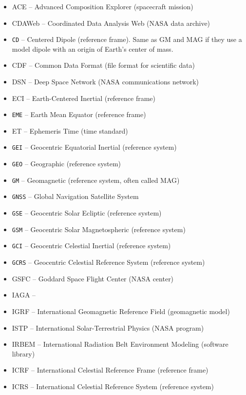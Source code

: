 \documentclass[draft]{agujournal2019}
\begin{document}
\begin{itemize}
\item ACE -- Advanced Composition Explorer (spacecraft mission)
\item CDAWeb -- Coordinated Data Analysis Web (NASA data archive)
\item \texttt{CD} -- Centered Dipole (reference frame). Same as GM and MAG if they use a model dipole with an origin of Earth's center of mass.
\item CDF -- Common Data Format (file format for scientific data)
\item DSN -- Deep Space Network (NASA communications network)
\item ECI -- Earth-Centered Inertial (reference frame)
\item  \texttt{EME} -- Earth Mean Equator (reference frame)
\item  ET -- Ephemeris Time (time standard)
\item  \texttt{GEI} -- Geocentric Equatorial Inertial (reference system)
\item  \texttt{GEO} -- Geographic (reference system)
\item  \texttt{GM} -- Geomagnetic (reference system, often called MAG)
\item  \texttt{GNSS} -- Global Navigation Satellite System
\item  \texttt{GSE} -- Geocentric Solar Ecliptic (reference system)
\item  \texttt{GSM} -- Geocentric Solar Magnetospheric (reference system)
\item  \texttt{GCI} -- Geocentric Celestial Inertial (reference system)
\item  \texttt{GCRS} -- Geocentric Celestial Reference System (reference system)
\item GSFC -- Goddard Space Flight Center (NASA center)
\item IAGA -- 
\item IGRF -- International Geomagnetic Reference Field (geomagnetic model)
\item ISTP -- International Solar-Terrestrial Physics (NASA program)
\item IRBEM -- International Radiation Belt Environment Modeling (software library)
\item ICRF -- International Celestial Reference Frame (reference frame)
\item ICRS -- International Celestial Reference System (reference system)

\end{itemize}
\end{document}
